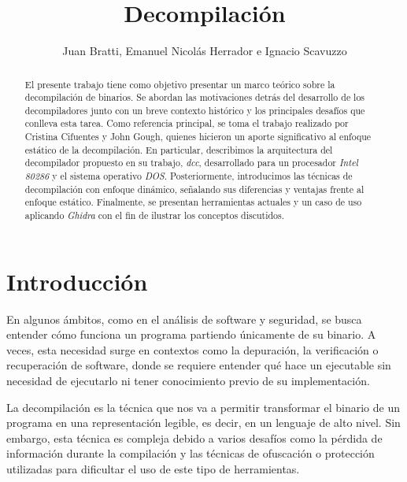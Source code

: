 \documentclass[runningheads]{llncs}
\begin{document}
%
\title{Decompilación}

%
\author{
  Juan Bratti, 
  Emanuel Nicolás Herrador e
  Ignacio Scavuzzo
}


\maketitle

%
\renewcommand{\abstractname}{Resumen}
\begin{abstract}
  El presente trabajo tiene como objetivo presentar un marco teórico sobre la decompilación de binarios.
  Se abordan las motivaciones detrás del desarrollo de los decompiladores junto con un breve contexto 
  histórico y los principales desafíos que conlleva esta tarea. Como referencia principal, se toma el 
  trabajo realizado por Cristina Cifuentes y John Gough, quienes hicieron un aporte significativo al 
  enfoque estático de la decompilación. En particular, describimos la arquitectura del decompilador 
  propuesto en su trabajo, \textit{dcc}, desarrollado para un procesador \textit{Intel 80286} y el 
  sistema operativo \textit{DOS}. Posteriormente, introducimos las técnicas de decompilación con enfoque 
  dinámico, señalando sus diferencias y ventajas frente al enfoque estático. Finalmente, se presentan 
  herramientas actuales y un caso de uso aplicando \textit{Ghidra} con el fin de ilustrar los conceptos 
  discutidos.
\end{abstract}

%
\section{Introducción}
En algunos ámbitos, como en el análisis de software y seguridad, se busca entender cómo funciona un 
programa partiendo únicamente de su binario. A veces, esta necesidad surge en contextos como la depuración,
la verificación o recuperación de software, donde se requiere entender qué hace un ejecutable sin necesidad 
de ejecutarlo ni tener conocimiento previo de su implementación.

La decompilación es la técnica que nos va a permitir transformar el binario de un programa en una 
representación legible, es decir, en un lenguaje de alto nivel. Sin embargo, esta técnica es compleja 
debido a varios desafíos como la pérdida de información durante la compilación y las técnicas de ofuscación 
o protección utilizadas para dificultar el uso de este tipo de herramientas.
\end{document}
